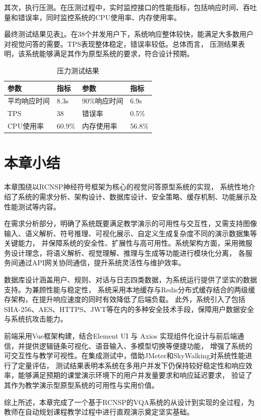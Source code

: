 其次，执行压测。在压测过程中，实时监控接口的性能指标，包括响应时间、吞吐量和错误率，同时监控系统的CPU使用率、内存使用率。

最终测试结果见表\ref{tab:test_result}。在38个并发用户下，系统响应整体较快，能满足大多数用户对视觉问答的需要。TPS表现整体稳定，错误率较低。总体而言，
压测结果表明，该系统能够满足其作为原型系统的要求，符合设计预期。
\begin{table}[h]
    \centering
    \renewcommand{\arraystretch}{1.3} %
    \begin{tabular}{|l|l|l|l|}
        \hline
        \textbf{参数} & \textbf{指标} & \textbf{参数} & \textbf{指标} \\
        \hline
        平均响应时间 & 8.3s & 90\%响应时间 & 6.9s \\
        \hline
        TPS & 38 & 错误率 & 0.5\% \\
        \hline
        CPU使用率 & 60.9\% & 内存使用率 & 56.8\% \\
        \hline
    \end{tabular}
    \caption{压力测试结果}
    \label{tab:test_result}
\end{table}
\section{本章小结}
本章围绕以RCNSP神经符号框架为核心的视觉问答原型系统的实现，
系统性地介绍了系统的需求分析、架构设计、数据库设计、安全策略、缓存机制、功能展示及性能测试等内容。

在需求分析部分，明确了系统既要满足教学演示的可用性与交互性，又需支持图像输入、语义解析、符号推理、可视化展示、自定义生成复杂度不同的演示数据集等关键能力，
并保障系统的安全性、扩展性与高可用性。系统架构方面，采用微服务设计理念，将语义解析、视觉理解、推理与生成等功能进行模块化分离，
各服务间通过API网关协同通信，提升系统灵活性与维护效率。

数据库设计涵盖用户、规则、对话与日志四类数据，为系统运行提供了坚实的数据支持。为兼顾性能与稳定性，
系统采用本地缓存与Redis分布式缓存结合的两级缓存架构，在提升响应速度的同时有效降低了后端负载。
此外，系统引入了包括SHA-256、AES、HTTPS、JWT等在内的多种安全技术手段，保障用户数据安全与系统抗攻击能力。

前端采用Vue框架构建，结合Element UI 与 Axios 实现组件化设计与前后端通信，并提供逻辑链条可视化、语音输入、多模型切换等便捷功能，
增强了系统的可交互性与教学可视性。在集成测试中，借助JMeter和SkyWalking对系统性能进行了定量评估，
测试结果表明本系统在多用户并发下仍保持较好稳定性和响应效率，能够满足预期的课堂演示环境下的用户并发量要求和响应延迟要求，
验证了其作为教学演示型原型系统的可用性与实用价值。

综上所述，本章完成了一个基于RCNSP的VQA系统的从设计到实现的全过程，为教师在自动规划课程教学过程中进行直观演示奠定坚实基础。